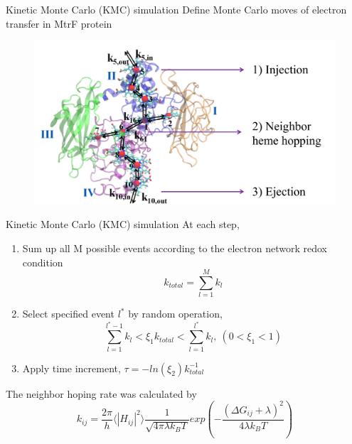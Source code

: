 \documentclass{beamer}
\begin{document}
\begin{frame}{Kinetic Monte Carlo (KMC) simulation}
Define Monte Carlo moves of electron transfer in MtrF protein
\begin{figure}
	\centering
	\includegraphics[width=\textwidth]{Pics/KMC_move.png}
\end{figure}
\end{frame}

\begin{frame}{Kinetic Monte Carlo (KMC) simulation}
At each step, 
\begin{enumerate}
\item Sum up all M possible events according to the electron network redox condition
\begin{equation}
	k_{total} = \sum_{l=1}^{M} k_l
\end{equation}
\item Select specified event $l^*$ by random operation, 
\begin{equation}
	\sum_{l=1}^{l^* -1} k_l < \xi_1 k_{total} < \sum_{l=1}^{l^*} k_l,\ (0<\xi_1<1)
\end{equation}
\item Apply time increment, $\tau = - ln(\xi_2)k_{total}^{-1}$
\end{enumerate}
The neighbor hoping rate was calculated by 
\begin{equation}
k_{ij} = \frac{2 \pi}{h} \langle|H_{ij}|^2\rangle \frac{1}{\sqrt{4 \pi \lambda k_B T}} exp\left( -\frac{(\Delta G_{ij} + \lambda)^2}{4 \lambda k_B T} \right)
\end{equation}
\end{frame}
\end{document}
